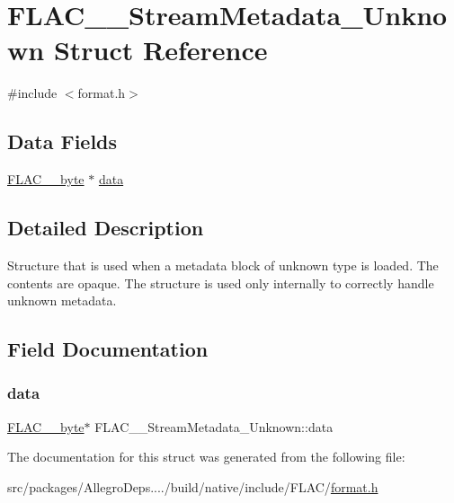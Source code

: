 \hypertarget{struct_f_l_a_c_____stream_metadata___unknown}{}\section{F\+L\+A\+C\+\_\+\+\_\+\+Stream\+Metadata\+\_\+\+Unknown Struct Reference}
\label{struct_f_l_a_c_____stream_metadata___unknown}


{\ttfamily \#include $<$format.\+h$>$}

\subsection*{Data Fields}
\begin{DoxyCompactItemize}
\item 
\hyperlink{ordinals_8h_a5eb569b12d5b047cdacada4d57924ee3}{F\+L\+A\+C\+\_\+\+\_\+byte} $\ast$ \hyperlink{struct_f_l_a_c_____stream_metadata___unknown_aacb09432bd01f2edcb5cebfc71efd79e}{data}
\end{DoxyCompactItemize}


\subsection{Detailed Description}
Structure that is used when a metadata block of unknown type is loaded. The contents are opaque. The structure is used only internally to correctly handle unknown metadata. 

\subsection{Field Documentation}
\mbox{\label{struct_f_l_a_c_____stream_metadata___unknown_aacb09432bd01f2edcb5cebfc71efd79e}} 
\subsubsection{\texorpdfstring{data}{data}}
{\footnotesize\ttfamily \hyperlink{ordinals_8h_a5eb569b12d5b047cdacada4d57924ee3}{F\+L\+A\+C\+\_\+\+\_\+byte}$\ast$ F\+L\+A\+C\+\_\+\+\_\+\+Stream\+Metadata\+\_\+\+Unknown\+::data}



The documentation for this struct was generated from the following file\+:\begin{DoxyCompactItemize}
\item 
src/packages/\+Allegro\+Deps..../build/native/include/\+F\+L\+A\+C/\hyperlink{format_8h}{format.\+h}\end{DoxyCompactItemize}
